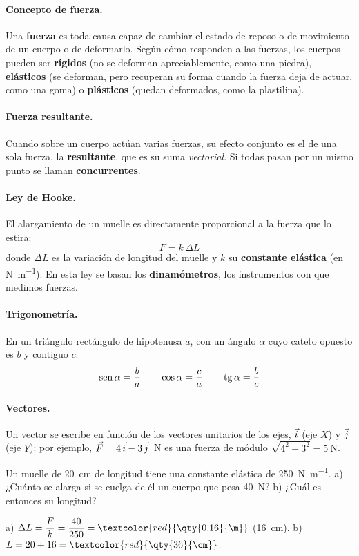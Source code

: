 \paragraph{Concepto de fuerza.} Una \textbf{fuerza} es toda causa capaz de cambiar el estado de reposo o de movimiento de un cuerpo o
de deformarlo. Según cómo responden a las fuerzas, los cuerpos pueden ser \textbf{rígidos} (no se deforman apreciablemente, como una
piedra), \textbf{elásticos} (se deforman, pero recuperan su forma cuando la fuerza deja de actuar, como una goma) o \textbf{plásticos}
(quedan deformados, como la plastilina).

\paragraph{Fuerza resultante.} Cuando sobre un cuerpo actúan varias fuerzas, su efecto conjunto es el de una sola fuerza, la
\textbf{resultante}, que es su suma \emph{vectorial}. Si todas pasan por un mismo punto se llaman \textbf{concurrentes}.

\paragraph{Ley de Hooke.} El alargamiento de un muelle es directamente proporcional a la fuerza que lo estira:
\[ F = k\,\Delta L \]
donde \(\Delta L\) es la variación de longitud del muelle y \(k\) su \textbf{constante elástica} (en \unit{\newton\per\m}). En esta ley
se basan los \textbf{dinamómetros}, los instrumentos con que medimos fuerzas.

\paragraph{Trigonometría.} En un triángulo rectángulo de hipotenusa \(a\), con un ángulo \(\alpha\) cuyo cateto opuesto es \(b\) y
contiguo \(c\):
\[ \operatorname{sen}\alpha = \frac{b}{a} \qquad \cos\alpha = \frac{c}{a} \qquad \operatorname{tg}\alpha = \frac{b}{c} \]

\paragraph{Vectores.} Un vector se escribe en función de los vectores unitarios de los ejes, \(\vec{i}\) (eje \(X\)) y \(\vec{j}\) (eje
\(Y\)): por ejemplo, \(\vec{F} = 4\,\vec{i} - 3\,\vec{j}\)~N es una fuerza de módulo \(\sqrt{4^2 + 3^2} = \qty{5}{\newton}\).

\begin{exercise}
    Un muelle de \qty{20}{\cm} de longitud tiene una constante elástica de \qty{250}{\newton\per\m}. a) ¿Cuánto se alarga si se
    cuelga de él un cuerpo que pesa \qty{40}{\newton}? b) ¿Cuál es entonces su longitud?
    \begin{solu}
        a) \(\Delta L = \dfrac{F}{k} = \dfrac{40}{250} = \textcolor{red}{\qty{0.16}{\m}}\) (\qty{16}{\cm}).
        b) \(L = 20 + 16 = \textcolor{red}{\qty{36}{\cm}}\).
    \end{solu}
\end{exercise}

